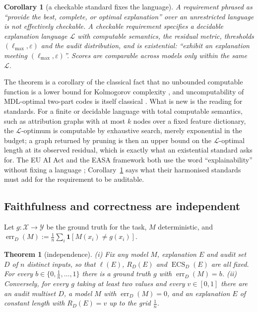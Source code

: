 \documentclass[11pt,letterpaper]{article}
\newcommand{\X}{\mathcal{X}}
\newcommand{\Y}{\mathcal{Y}}
\newcommand{\Lang}{\mathcal{L}}
\newcommand{\D}{D}
\newcommand{\ind}[1]{\mathbf{1}[#1]}
\DeclareMathOperator{\ECS}{ECS}
\DeclareMathOperator{\err}{err}
\theoremstyle{plain}
\newtheorem{theorem}{Theorem}
\newtheorem{corollary}{Corollary}
\theoremstyle{definition}
\theoremstyle{remark}
\begin{document}
\begin{corollary}[a checkable standard fixes the language]
\label{cor:checkable}
A requirement phrased as ``provide the best, complete, or optimal explanation'' over an unrestricted language is not effectively checkable. A checkable requirement specifies a decidable explanation language $\Lang$ with computable semantics, the residual metric, thresholds $(\ell_{\max},\varepsilon)$ and the audit distribution, and is existential: ``exhibit an explanation meeting $(\ell_{\max},\varepsilon)$''. Scores are comparable across models only within the same $\Lang$.
\end{corollary}

The theorem is a corollary of the classical fact that no unbounded computable function is a lower bound for Kolmogorov complexity \citep[\S2.3]{livitanyi2008}, and uncomputability of MDL-optimal two-part codes is itself classical \citep{vereshchagin2004}. What is new is the reading for standards. For a finite or decidable language with total computable semantics, such as attribution graphs with at most $k$ nodes over a fixed feature dictionary, the $\Lang$-optimum is computable by exhaustive search, merely exponential in the budget; a graph returned by pruning \citep{ameisen2025circuit} is then an upper bound on the $\Lang$-optimal length at its observed residual, which is exactly what an existential standard asks for. The EU AI Act and the EASA framework both use the word ``explainability'' without fixing a language \citep{euaiact2024,easa2024}; Corollary~\ref{cor:checkable} says what their harmonised standards must add for the requirement to be auditable.

\subsection{Faithfulness and correctness are independent}

Let $g:\X\to\Y$ be the ground truth for the task, $M$ deterministic, and $\err_{\D}(M):=\frac1n\sum_i\ind{M(x_i)\neq g(x_i)}$.

\begin{theorem}[independence]
\label{thm:independence}
(i) Fix any model $M$, explanation $E$ and audit set $\D$ of $n$ distinct inputs, so that $\ell(E)$, $R_{\D}(E)$ and $\ECS_{\D}(E)$ are all fixed. For every $b\in\{0,\frac1n,\dots,1\}$ there is a ground truth $g$ with $\err_{\D}(M)=b$. (ii) Conversely, for every $g$ taking at least two values and every $v\in[0,1]$ there are an audit multiset $\D$, a model $M$ with $\err_{\D}(M)=0$, and an explanation $E$ of constant length with $R_{\D}(E)=v$ up to the grid $\frac1n$.
\end{theorem}
\end{document}
